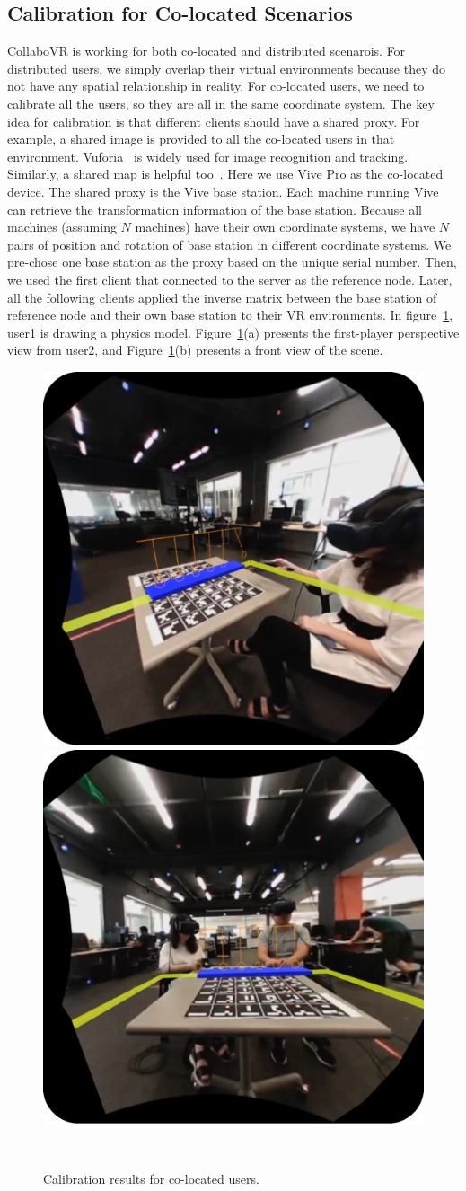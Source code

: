 \documentclass{sigchi}
\begin{document}
\subsection{Calibration for Co-located Scenarios}
CollaboVR is working for both co-located and distributed scenarois. For distributed users, we simply overlap their virtual environments because they do not have any spatial relationship in reality. For co-located users, we need to calibrate all the users, so they are all in the same coordinate system. The key idea for calibration is that different clients should have a shared proxy. For example, a shared image is provided to all the co-located users in that environment. Vuforia~\cite{Vuforia} is widely used for image recognition and tracking. Similarly, a shared map is helpful too~\cite{Hololens}. Here we use Vive Pro as the co-located device. The shared proxy is the Vive base station. Each machine running Vive can retrieve the transformation information of the base station. Because all machines (assuming $N$ machines) have their own coordinate systems, we have $N$ pairs of position and rotation of base station in different coordinate systems. We pre-chose one base station as the proxy based on the unique serial number. Then, we used the first client that connected to the server as the reference node. Later, all the following clients applied the inverse matrix between the base station of reference node and their own base station to their VR environments. In figure~\ref{fig:vivepro}, user1 is drawing a physics model. Figure~\ref{fig:vivepro}(a) presents the first-player perspective view from user2, and Figure~\ref{fig:vivepro}(b) presents a front view of the scene.

\begin{figure}[tb!]
 \centering
 \includegraphics[width=0.45\columnwidth]{Figure4_left.png}
 \includegraphics[width=0.45\columnwidth]{figure4_right.png}
 \caption{Calibration results for co-located users.
 }~\label{fig:vivepro}
\end{figure}
\end{document}
